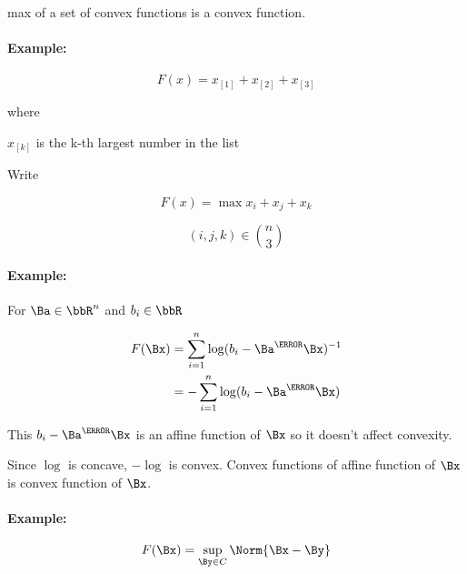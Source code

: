 max of a set of convex functions is a convex function.

\paragraph{Example:}

\begin{dmath}\label{eqn:convexOptimizationLecture7:500}
F(x) =
x_{[1]} +
x_{[2]} +
x_{[3]}
\end{dmath}

where

\( x_{[k]} \) is the k-th largest number in the list

Write

\begin{dmath}\label{eqn:convexOptimizationLecture7:520}
F(x) = \max x_i + x_j + x_k
\end{dmath}

\begin{dmath}\label{eqn:convexOptimizationLecture7:540}
(i,j,k) \in \binom{n}{3}
\end{dmath}

\paragraph{Example:}

For \( \Ba \in \bbR^n \) and \( b_i \in \bbR \)

\begin{dmath}\label{eqn:convexOptimizationLecture7:560}
\begin{aligned}
F(\Bx)
&= \sum_{i = 1}^n \log( b_i - \Ba^\T \Bx )^{-1} \\
&= -\sum_{i = 1}^n \log( b_i - \Ba^\T \Bx )
\end{aligned}
\end{dmath}

This \( b_i - \Ba^\T \Bx \) is an affine function of \( \Bx \) so it doesn't affect convexity.

Since \( \log \) is concave, \( -\log \) is convex.  Convex functions of affine function of \( \Bx \) is convex function of \( \Bx \).

\paragraph{Example:}
\begin{dmath}\label{eqn:convexOptimizationLecture7:580}
F(\Bx) = \sup_{\By \in C} \Norm{ \Bx -  \By }
\end{dmath}

